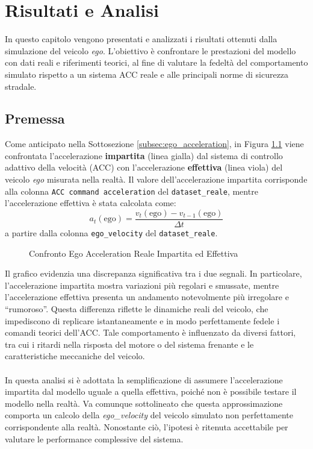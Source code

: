 \chapter{Risultati e Analisi}
\label{cha:risultati}
In questo capitolo vengono presentati e analizzati i risultati ottenuti dalla simulazione del veicolo \emph{ego}. 
L'obiettivo è confrontare le prestazioni del modello con dati reali e riferimenti teorici, al fine di valutare la 
fedeltà del comportamento simulato rispetto a un sistema ACC reale e alle principali norme di sicurezza stradale.

\section{Premessa}
\label{sec:premessa}
Come anticipato nella Sottosezione \ref{subsec:ego_acceleration}, in Figura \ref{fig:acceleration_effettiva_impartita} 
viene confrontata l'accelerazione \textbf{impartita} (linea gialla) dal sistema di controllo adattivo della velocità (ACC) 
con l'accelerazione \textbf{effettiva} (linea viola) del veicolo \emph{ego} misurata nella realtà.  
Il valore dell'accelerazione impartita corrisponde alla colonna \texttt{ACC command acceleration} del \texttt{dataset\_reale}, 
mentre l'accelerazione effettiva è stata calcolata come:
\[
a_t(\mathrm{ego}) = \frac{v_t(\mathrm{ego}) - v_{t-1}(\mathrm{ego})}{\Delta t}
\]
a partire dalla colonna \texttt{ego\_velocity} del \texttt{dataset\_reale}.
\begin{figure}[H]
    \centering
    \caption{Confronto Ego Acceleration Reale Impartita ed Effettiva}
    \label{fig:acceleration_effettiva_impartita}
\end{figure}
\noindent Il grafico evidenzia una discrepanza significativa tra i due segnali.  
In particolare, l'accelerazione impartita mostra variazioni più regolari e smussate, mentre l'accelerazione effettiva presenta un andamento 
notevolmente più irregolare e “rumoroso”.  
Questa differenza riflette le dinamiche reali del veicolo, che impediscono di replicare istantaneamente e in modo perfettamente fedele 
i comandi teorici dell'ACC.  
Tale comportamento è influenzato da diversi fattori, tra cui i ritardi nella risposta del motore o del sistema frenante 
e le caratteristiche meccaniche del veicolo.
\\\\
\noindent In questa analisi si è adottata la semplificazione di assumere l'accelerazione impartita dal modello uguale a quella 
effettiva, poiché non è possibile testare il modello nella realtà. Va comunque sottolineato che questa approssimazione 
comporta un calcolo della \emph{ego\_velocity} del veicolo simulato non perfettamente corrispondente alla realtà.  
Nonostante ciò, l'ipotesi è ritenuta accettabile per valutare le performance complessive del sistema.





